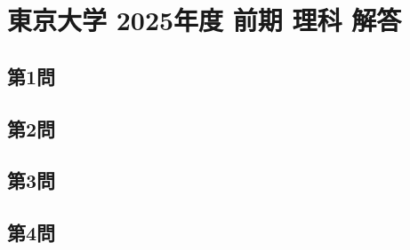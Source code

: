 ﻿\documentclass[../../uem_tok_a.tex]{subfiles}
\begin{document}
    \section{東京大学 2025年度 前期 理科 解答}

    \subsection{第1問}
    

    \clearpage

    \subsection{第2問}
    

    \clearpage

    \subsection{第3問}
    

    \clearpage

    \subsection{第4問}
    
\end{document}
